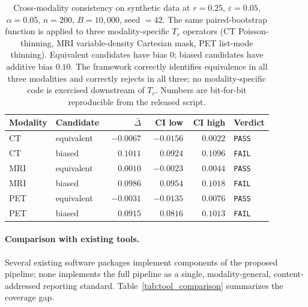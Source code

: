 \documentclass[twoside,11pt]{article}
\begin{document}
\begin{table}[ht]
    \centering
    \small
    \begin{tabular}{llrrrl}
        \toprule
        \textbf{Modality} & \textbf{Candidate} & \textbf{$\bar\Delta$} & \textbf{CI low} & \textbf{CI high} & \textbf{Verdict} \\
        \midrule
        CT  & equivalent & $-0.0067$ & $-0.0156$ & $\phantom{-}0.0022$ & \texttt{PASS} \\
        CT  & biased     & $\phantom{-}0.1011$ & $\phantom{-}0.0924$ & $\phantom{-}0.1096$ & \texttt{FAIL} \\
        MRI & equivalent & $\phantom{-}0.0010$ & $-0.0023$ & $\phantom{-}0.0044$ & \texttt{PASS} \\
        MRI & biased     & $\phantom{-}0.0986$ & $\phantom{-}0.0954$ & $\phantom{-}0.1018$ & \texttt{FAIL} \\
        PET & equivalent & $-0.0031$ & $-0.0135$ & $\phantom{-}0.0076$ & \texttt{PASS} \\
        PET & biased     & $\phantom{-}0.0915$ & $\phantom{-}0.0816$ & $\phantom{-}0.1013$ & \texttt{FAIL} \\
        \bottomrule
    \end{tabular}
    \caption{Cross-modality consistency on synthetic data at $r = 0.25$, $\varepsilon = 0.05$, $\alpha = 0.05$, $n = 200$, $B = 10{,}000$, seed $= 42$. The same paired-bootstrap function is applied to three modality-specific $T_r$ operators (CT Poisson-thinning, MRI variable-density Cartesian mask, PET list-mode thinning). Equivalent candidates have bias $0$; biased candidates have additive bias $0.10$. The framework correctly identifies equivalence in all three modalities and correctly rejects in all three; no modality-specific code is exercised downstream of $T_r$. Numbers are bit-for-bit reproducible from the released script.}
    \label{tab:consistency}
\end{table}

\paragraph{Comparison with existing tools.} Several existing software packages implement components of the proposed pipeline; none implements the full pipeline as a single, modality-general, content-addressed reporting standard. Table~\ref{tab:tool_comparison} summarizes the coverage gap.
\end{document}
